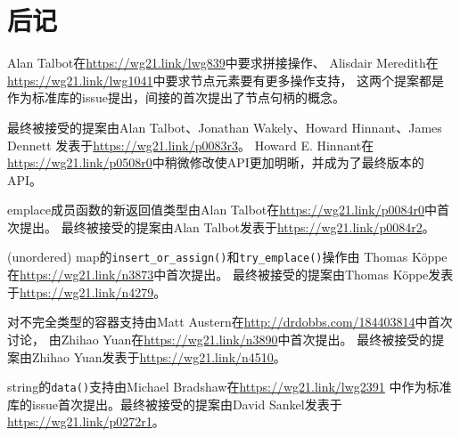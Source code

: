 \section{后记}
Alan Talbot在\url{https://wg21.link/lwg839}中要求拼接操作、
Alisdair Meredith在\url{https://wg21.link/lwg1041}中要求节点元素要有更多操作支持，
这两个提案都是作为标准库的issue提出，间接的首次提出了节点句柄的概念。

最终被接受的提案由Alan Talbot、Jonathan Wakely、Howard Hinnant、James Dennett
发表于\url{https://wg21.link/p0083r3}。
Howard E. Hinnant在\url{https://wg21.link/p0508r0}中稍微修改使API更加明晰，并成为了最终版本的API。

emplace成员函数的新返回值类型由Alan Talbot在\url{https://wg21.link/p0084r0}中首次提出。
最终被接受的提案由Alan Talbot发表于\url{https://wg21.link/p0084r2}。

(unordered) map的\texttt{insert\_or\_assign()}和\texttt{try\_emplace()}操作由
Thomas Köppe在\url{https://wg21.link/n3873}中首次提出。
最终被接受的提案由Thomas Köppe发表于\url{https://wg21.link/n4279}。

对不完全类型的容器支持由Matt Austern在\url{http://drdobbs.com/184403814}中首次讨论，
由Zhihao Yuan在\url{https://wg21.link/n3890}中首次提出。
最终被接受的提案由Zhihao Yuan发表于\url{https://wg21.link/n4510}。

string的\texttt{data()}支持由Michael Bradshaw在\url{https://wg21.link/lwg2391}
中作为标准库的issue首次提出。最终被接受的提案由David Sankel发表于\url{https://wg21.link/p0272r1}。
